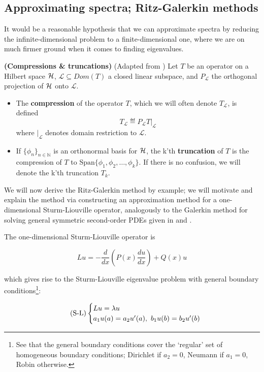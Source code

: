 \documentclass[../main.tex]{subfiles}
\begin{document}
\subsection{Approximating spectra; Ritz-Galerkin methods}

It would be a reasonable hypothesis that we can approximate spectra by reducing the infinite-dimensional problem to a finite-dimensional one, where
we are on much firmer ground when it comes to finding eigenvalues.

\begin{definition}{\textbf{(Compressions \& truncations)}}
(Adapted from \parencite{davies1995spectral})
Let $T$ be an operator on a Hilbert space $\mathcal{H}$, $\mathcal{L} \subseteq Dom(T)$ a closed linear subspace, and $P_\mathcal{L}$ the orthogonal projection
of $\mathcal{H}$ onto $\mathcal{L}$.
\begin{itemize}
\item The \textbf{compression} of the operator $T$, which we will often denote $T_\mathcal{L}$, is defined
$$T_\mathcal{L} \eqdef P_\mathcal{L} T\big|_{\mathcal{L}}$$
where $\big|_{\mathcal{L}}$ denotes domain restriction to $\mathcal{L}$.
\item If $\{\phi_n\}_{n \in \mathbb{N}}$ is an orthonormal basis for $\mathcal{H}$, the k'th \textbf{truncation} of $T$ is the compression of $T$ to $\text{Span}\{\phi_1, \phi_2, \hdots, \phi_k\}$. If there is no confusion, we will denote the k'th truncation $T_k$.
\end{itemize}
\end{definition}

We will now derive the Ritz-Galerkin method by example; we will motivate and explain the method via constructing an approximation method for a one-dimensional Sturm-Liouville operator, analogously to the Galerkin method for solving general symmetric second-order PDEs given in \cite{suli2003introduction} and \cite{pryce1993numerical}. 

The one-dimensional Sturm-Liouville operator is

$$Lu = - \frac{d}{dx}(P(x)\frac{du}{dx}) + Q(x)u$$ 

which gives rise to the Sturm-Liouville eigenvalue problem with general boundary conditions\footnote{See that the general boundary conditions cover the `regular' set of homogeneous boundary conditions; Dirichlet if $a_2 = 0$, Neumann if $a_1 = 0$, Robin otherwise.}:

\begin{equation*}\label{eqn:sturm-liouville}
\tag{S-L}
\begin{cases}
Lu = \lambda u$$ \\
a_1 u(a) = a_2 u'(a), \ b_1 u(b) = b_2 u'(b)
\end{cases}
\end{equation*}
\end{document}
